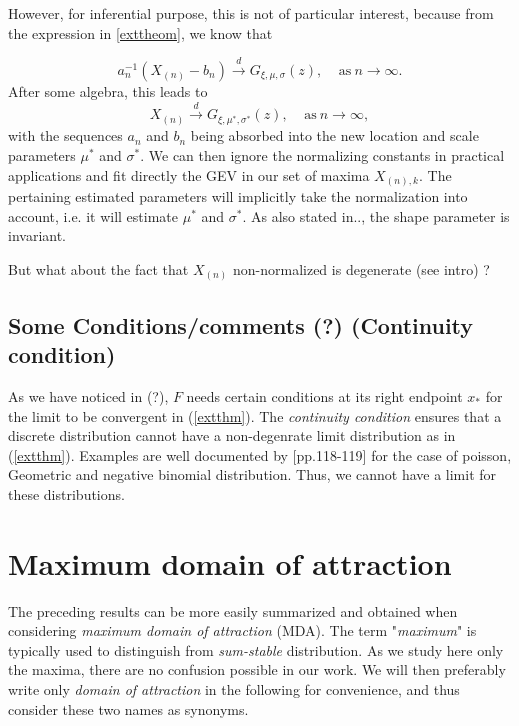 \documentclass[11pt,a4paper,openany ]{book}
\begin{document}
However, for inferential purpose, this is not of particular interest, because from the expression in \ref{exttheom}, we know that

\begin{equation} \label{convseq1}
a_n^{-1}(X_{(n)}-b_n)\stackrel{d}{\longrightarrow} G_{\xi,\mu,\sigma}(z), \ \ \ \ \ \text{as} \ n\rightarrow\infty.
\end{equation}
After some algebra, this leads to 
\begin{equation}\label{convseq2}
X_{(n)}\stackrel{d}{\longrightarrow} G_{\xi,\mu^*,\sigma^*}(z), \ \ \ \ \ \text{as} \ n\rightarrow\infty,
\end{equation}
with the sequences $a_n$ and $b_n$ being absorbed into the new location and scale parameters $\mu^*$ and $\sigma^*$. We can then ignore the normalizing constants in practical applications and fit directly the GEV in our set of maxima $X_{(n),k}$.
The pertaining estimated parameters will implicitly take the normalization into account, i.e. it will estimate $\mu^*$ and $\sigma^*$.
As also stated in..,  the shape parameter is invariant.

But what about the fact that $X_{(n)}$ non-normalized is degenerate (see intro) ?

\subsection*{Some Conditions/comments (?) (Continuity condition)}

As we have noticed in (?), $F$ needs certain conditions at its right endpoint $x_*$ for the limit to be convergent in (\ref{extthm}). The \emph{continuity condition} ensures that a discrete distribution cannot have a non-degenrate limit distribution as in (\ref{extthm}). Examples are well documented by  \citet{modelling_embrechts_1997}[pp.118-119] for the case of poisson, Geometric and negative binomial distribution. Thus, we cannot have a limit for these distributions.


\section{Maximum domain of attraction}

The preceding results can be more easily summarized and obtained when considering \emph{maximum domain of attraction} (MDA). The term "\emph{maximum}" is typically used to distinguish from \emph{sum-stable} distribution. As we study here only the maxima, there are no confusion possible in our work. We will then preferably write only \emph{domain of attraction} in the following for convenience, and thus consider these two names as synonyms.
\end{document}
